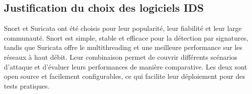 \subsection{Justification du choix des logiciels IDS}
Snort et Suricata ont été choisis pour leur popularité, leur fiabilité et leur large communauté. Snort est simple, stable et efficace pour la détection par signatures, tandis que Suricata offre le multithreading et une meilleure performance sur les réseaux à haut débit. Leur combinaison permet de couvrir différents scénarios d'attaque et d'évaluer leurs performances de manière comparative. Les deux sont open source et facilement configurables, ce qui facilite leur déploiement pour des tests pratiques.
\FloatBarrier
